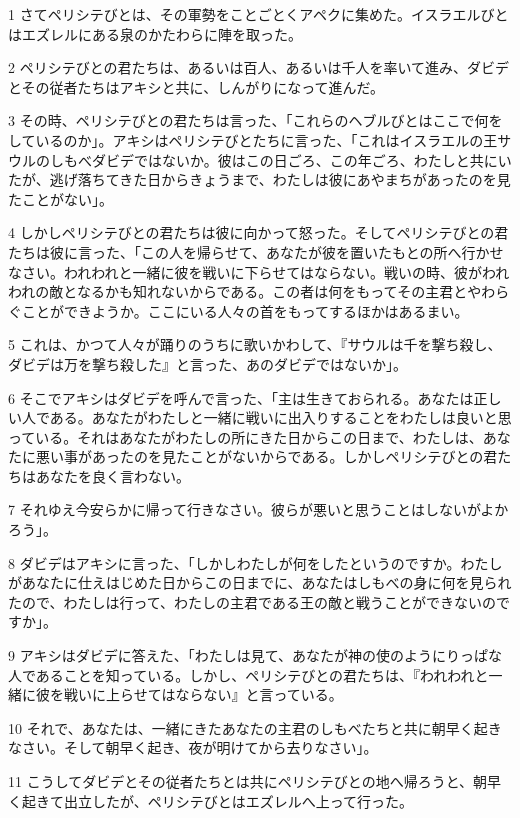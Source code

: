 \par 1 さてペリシテびとは、その軍勢をことごとくアペクに集めた。イスラエルびとはエズレルにある泉のかたわらに陣を取った。
\par 2 ペリシテびとの君たちは、あるいは百人、あるいは千人を率いて進み、ダビデとその従者たちはアキシと共に、しんがりになって進んだ。
\par 3 その時、ペリシテびとの君たちは言った、「これらのヘブルびとはここで何をしているのか」。アキシはペリシテびとたちに言った、「これはイスラエルの王サウルのしもべダビデではないか。彼はこの日ごろ、この年ごろ、わたしと共にいたが、逃げ落ちてきた日からきょうまで、わたしは彼にあやまちがあったのを見たことがない」。
\par 4 しかしペリシテびとの君たちは彼に向かって怒った。そしてペリシテびとの君たちは彼に言った、「この人を帰らせて、あなたが彼を置いたもとの所へ行かせなさい。われわれと一緒に彼を戦いに下らせてはならない。戦いの時、彼がわれわれの敵となるかも知れないからである。この者は何をもってその主君とやわらぐことができようか。ここにいる人々の首をもってするほかはあるまい。
\par 5 これは、かつて人々が踊りのうちに歌いかわして、『サウルは千を撃ち殺し、ダビデは万を撃ち殺した』と言った、あのダビデではないか」。
\par 6 そこでアキシはダビデを呼んで言った、「主は生きておられる。あなたは正しい人である。あなたがわたしと一緒に戦いに出入りすることをわたしは良いと思っている。それはあなたがわたしの所にきた日からこの日まで、わたしは、あなたに悪い事があったのを見たことがないからである。しかしペリシテびとの君たちはあなたを良く言わない。
\par 7 それゆえ今安らかに帰って行きなさい。彼らが悪いと思うことはしないがよかろう」。
\par 8 ダビデはアキシに言った、「しかしわたしが何をしたというのですか。わたしがあなたに仕えはじめた日からこの日までに、あなたはしもべの身に何を見られたので、わたしは行って、わたしの主君である王の敵と戦うことができないのですか」。
\par 9 アキシはダビデに答えた、「わたしは見て、あなたが神の使のようにりっぱな人であることを知っている。しかし、ペリシテびとの君たちは、『われわれと一緒に彼を戦いに上らせてはならない』と言っている。
\par 10 それで、あなたは、一緒にきたあなたの主君のしもべたちと共に朝早く起きなさい。そして朝早く起き、夜が明けてから去りなさい」。
\par 11 こうしてダビデとその従者たちとは共にペリシテびとの地へ帰ろうと、朝早く起きて出立したが、ペリシテびとはエズレルへ上って行った。

